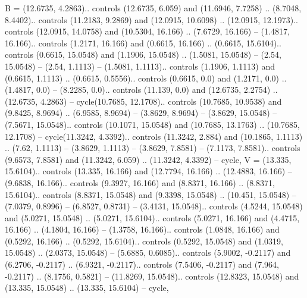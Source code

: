 {B} = {(12.6735, 4.2863).. controls (12.6735, 6.059) and (11.6946, 7.7258) .. (8.7048, 8.4402).. controls (11.2183, 9.2869) and (12.0915, 10.6098) .. (12.0915, 12.1973).. controls (12.0915, 14.0758) and (10.5304, 16.166) .. (7.6729, 16.166) -- (1.4817, 16.166).. controls (1.2171, 16.166) and (0.6615, 16.166) .. (0.6615, 15.6104).. controls (0.6615, 15.0548) and (1.1906, 15.0548) .. (1.5081, 15.0548) -- (2.54, 15.0548) -- (2.54, 1.1113) -- (1.5081, 1.1113).. controls (1.1906, 1.1113) and (0.6615, 1.1113) .. (0.6615, 0.5556).. controls (0.6615, 0.0) and (1.2171, 0.0) .. (1.4817, 0.0) -- (8.2285, 0.0).. controls (11.139, 0.0) and (12.6735, 2.2754) .. (12.6735, 4.2863) -- cycle(10.7685, 12.1708).. controls (10.7685, 10.9538) and (9.8425, 8.9694) .. (6.9585, 8.9694) -- (3.8629, 8.9694) -- (3.8629, 15.0548) -- (7.5671, 15.0548).. controls (10.1071, 15.0548) and (10.7685, 13.1763) .. (10.7685, 12.1708) -- cycle(11.3242, 4.3392).. controls (11.3242, 2.884) and (10.1865, 1.1113) .. (7.62, 1.1113) -- (3.8629, 1.1113) -- (3.8629, 7.8581) -- (7.1173, 7.8581).. controls (9.6573, 7.8581) and (11.3242, 6.059) .. (11.3242, 4.3392) -- cycle},
{V} = {(13.335, 15.6104).. controls (13.335, 16.166) and (12.7794, 16.166) .. (12.4883, 16.166) -- (9.6838, 16.166).. controls (9.3927, 16.166) and (8.8371, 16.166) .. (8.8371, 15.6104).. controls (8.8371, 15.0548) and (9.3398, 15.0548) .. (10.451, 15.0548) -- (7.0379, 0.8996) -- (6.8527, 0.8731) -- (3.4131, 15.0548).. controls (4.5244, 15.0548) and (5.0271, 15.0548) .. (5.0271, 15.6104).. controls (5.0271, 16.166) and (4.4715, 16.166) .. (4.1804, 16.166) -- (1.3758, 16.166).. controls (1.0848, 16.166) and (0.5292, 16.166) .. (0.5292, 15.6104).. controls (0.5292, 15.0548) and (1.0319, 15.0548) .. (2.0373, 15.0548) -- (5.6885, 0.6085).. controls (5.9002, -0.2117) and (6.2706, -0.2117) .. (6.9321, -0.2117).. controls (7.5406, -0.2117) and (7.964, -0.2117) .. (8.1756, 0.5821) -- (11.8269, 15.0548).. controls (12.8323, 15.0548) and (13.335, 15.0548) .. (13.335, 15.6104) -- cycle},
